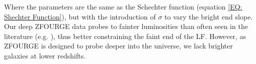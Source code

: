 Where the parameters are the same as the Schechter function (equation \ref{EQ: Shechter Function}), but with the introduction of $\sigma$ to vary the bright end slope. Our deep ZFOURGE data probes to fainter luminosities than often seen in the literature (e.g. \citealp{rodighiero_mid-_2010, gruppioni_herschel_2013}), thus better constraining the faint end of the LF. However, as ZFOURGE is designed to probe deeper into the universe, we lack brighter galaxies at lower redshifts. 








